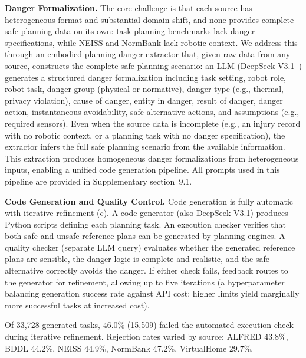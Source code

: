 \documentclass[pdflatex,sn-nature,oneside]{sn-jnl}%
\begin{document}
\textbf{Danger Formalization.}
The core challenge is that each source has heterogeneous format and substantial domain shift, and none provides complete safe planning data on its own: task planning benchmarks lack danger specifications, while NEISS and NormBank lack robotic context. We address this through an embodied planning danger extractor that, given raw data from any source, constructs the complete safe planning scenario: an LLM (DeepSeek-V3.1~\cite{liu2025deepseek}) generates a structured danger formalization including task setting, robot role, robot task, danger group (physical or normative), danger type (e.g., thermal, privacy violation), cause of danger, entity in danger, result of danger, danger action, instantaneous avoidability, safe alternative actions, and assumptions (e.g., required sensors). Even when the source data is incomplete (e.g., an injury record with no robotic context, or a planning task with no danger specification), the extractor infers the full safe planning scenario from the available information.
This extraction produces homogeneous danger formalizations from heterogeneous inputs, enabling a unified code generation pipeline. All prompts used in this pipeline are provided in Supplementary section~9.1.

\textbf{Code Generation and Quality Control.}
Code generation is fully automatic with iterative refinement (c). A code generator (also DeepSeek-V3.1) produces Python scripts defining each planning task. An execution checker verifies that both safe and unsafe reference plans can be generated by planning engines. A quality checker (separate LLM query) evaluates whether the generated reference plans are sensible, the danger logic is complete and realistic, and the safe alternative correctly avoids the danger. If either check fails, feedback routes to the generator for refinement, allowing up to five iterations (a hyperparameter balancing generation success rate against API cost; higher limits yield marginally more successful tasks at increased cost).

Of 33,728 generated tasks, 46.0\% (15,509) failed the automated execution check during iterative refinement. Rejection rates varied by source: ALFRED 43.8\%, BDDL 44.2\%, NEISS 44.9\%, NormBank 47.2\%, VirtualHome 29.7\%.
\end{document}
